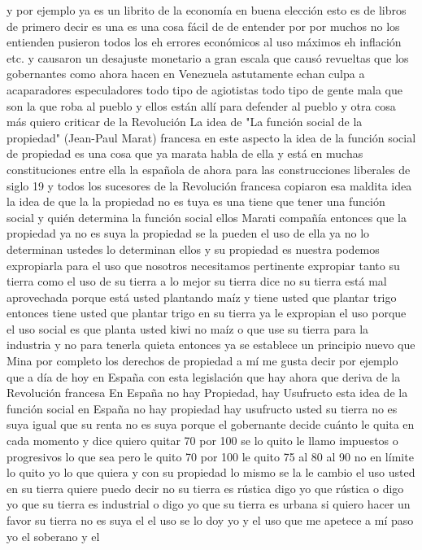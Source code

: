 y por ejemplo ya es un librito de la economía en buena elección esto es de libros de primero decir es una
es una cosa fácil de de entender por por muchos no los entienden pusieron todos los eh errores económicos
al uso máximos eh inflación etc. y causaron un desajuste monetario a gran escala
que causó revueltas que los gobernantes como ahora hacen en Venezuela
astutamente echan culpa a acaparadores especuladores todo tipo de agiotistas todo tipo de gente mala
que son la que roba al pueblo y ellos están allí para defender al pueblo y otra cosa más quiero criticar de la Revolución
La idea de "La función social de la propiedad" (Jean-Paul Marat)
francesa en este aspecto la idea de la función social de propiedad
es una cosa que ya marata habla de ella y está en muchas constituciones entre ella la española de ahora para las construcciones liberales de siglo 19
y todos los sucesores de la Revolución francesa copiaron esa maldita idea la idea de que la la propiedad no es tuya
es una tiene que tener una función social y quién determina la función social ellos Marati compañía
entonces que la propiedad ya no es suya la propiedad se la pueden el uso de ella ya no lo determinan ustedes
lo determinan ellos y su propiedad es nuestra podemos expropiarla para el uso que nosotros necesitamos pertinente
expropiar tanto su tierra como el uso de su tierra a lo mejor su tierra dice no su tierra está mal aprovechada porque está usted plantando maíz
y tiene usted que plantar trigo entonces tiene usted que plantar trigo en su tierra ya le expropian el uso porque el uso social es que planta usted kiwi no maíz
o que use su tierra para la industria y no para tenerla quieta entonces ya se establece un principio nuevo que Mina por completo los derechos de propiedad
a mí me gusta decir por ejemplo que a día de hoy en España con esta legislación que hay ahora que deriva de la Revolución francesa
En España no hay Propiedad, hay Usufructo
esta idea de la función social en España no hay propiedad hay usufructo usted su tierra no es suya
igual que su renta no es suya porque el gobernante decide cuánto le quita en cada momento y dice quiero quitar 70 por 100
se lo quito le llamo impuestos o progresivos lo que sea pero le quito 70 por 100 le quito 75 al 80 al 90 no en límite lo quito yo lo que quiera
y con su propiedad lo mismo se la le cambio el uso usted en su tierra quiere puedo decir no
su tierra es rústica digo yo que rústica o digo yo que su tierra es industrial o digo yo que su tierra es urbana
si quiero hacer un favor su tierra no es suya el el uso se lo doy yo y el uso que me apetece a mí paso yo el soberano y el
